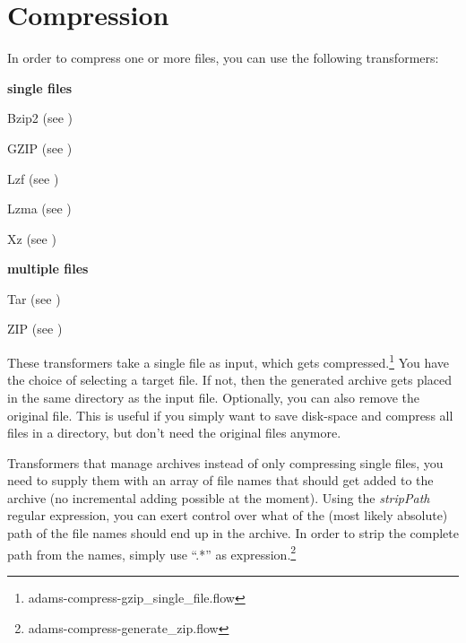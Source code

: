 \documentclass[a4paper]{book}
\begin{document}
\chapter{Compression}
In order to compress one or more files, you can use the following transformers:
\begin{tight_itemize}
	\item \textbf{single files}
	\begin{tight_itemize}
		\item Bzip2 (see \cite{bzip2})
		\item GZIP (see \cite{gzip})
		\item Lzf (see \cite{lzf})
		\item Lzma (see \cite{lzma})
		\item Xz (see \cite{xz})
	\end{tight_itemize}
	\item \textbf{multiple files}
	\begin{tight_itemize}
		\item Tar (see \cite{tar})
		\item ZIP (see \cite{zip})
	\end{tight_itemize}
\end{tight_itemize}

These transformers take a single file as input, which gets 
compressed.\footnote{adams-compress-gzip\_single\_file.flow}
You have the choice of selecting a target file. If not, then the generated
archive gets placed in the same directory as the input file. Optionally,
you can also remove the original file. This is useful if you simply want
to save disk-space and compress all files in a directory, but don't need
the original files anymore.

Transformers that manage archives instead of only compressing single files,
you need to supply them with an array of file names that should get added
to the archive (no incremental adding possible at the moment). Using the
\textit{stripPath} regular expression, you can exert control over what of
the (most likely absolute) path of the file names should end up in the
archive. In order to strip the complete path from the names, simply use
``.*'' as expression.\footnote{adams-compress-generate\_zip.flow}


\end{document}
